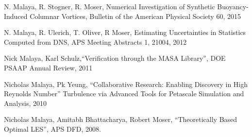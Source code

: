 N. Malaya, R. Stogner, R. Moser,
Numerical Investigation of Synthetic Buoyancy-Induced Columnar Vortices,
Bulletin of the American Physical Society 60, 2015

\blankline

N. Malaya, R. Ulerich, T. Oliver, R Moser, Estimating Uncertainties in
Statistics Computed from DNS, APS Meeting Abstracts 1, 21004, 2012 

\blankline

Nick Malaya, Karl Schulz,``Verification through the MASA Library'', DOE
PSAAP Annual Review, 2011

\blankline

Nicholas Malaya,  Pk Yeung, ``Collaborative Research: Enabling Discovery in High Reynolds Number''
Turbulence via Advanced Tools for Petascale Simulation and Analysis, 2010

\blankline

Nicholas Malaya, Amitabh Bhattacharya, Robert Moser,
``Theoretically Based Optimal LES'', APS DFD, 2008.
